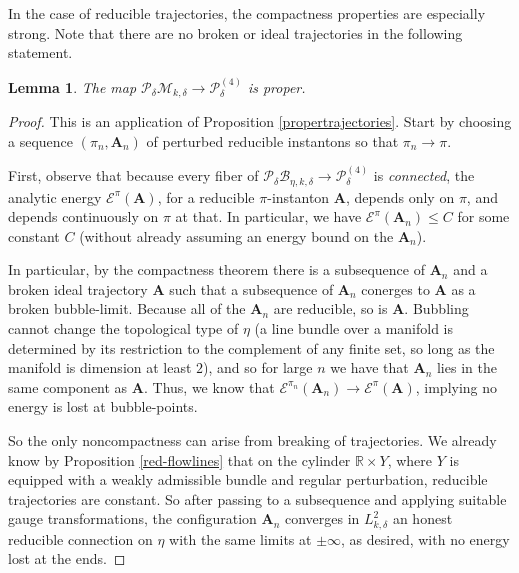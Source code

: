 \documentclass{memo-l}
\newtheorem{lemma}[theorem]{Lemma}
\theoremstyle{definition}
\theoremstyle{remark}
\numberwithin{section}{chapter}
\numberwithin{equation}{chapter}
\begin{document}
In the case of reducible trajectories, the compactness properties are especially strong. Note that there are no broken or ideal trajectories in the following statement.

\begin{lemma}\label{C-proper}The map $\mathcal P_\delta \mathcal M_{k,\delta} \to \mathcal P^{(4)}_{\delta}$ is proper.
\end{lemma}

\begin{proof}This is an application of Proposition \ref{propertrajectories}. Start by choosing a sequence $(\pi_n, \mathbf{A}_n)$ of perturbed reducible instantons so that $\pi_n \to \pi$.

First, observe that because every fiber of $\mathcal P_\delta \mathcal B_{\eta, k, \delta} \to \mathcal P^{(4)}_\delta$ is \emph{connected}, the analytic energy $\mathcal E^\pi(\mathbf{A})$, for a reducible $\pi$-instanton $\mathbf{A}$, depends only on $\pi$, and depends continuously on $\pi$ at that. In particular, we have $\mathcal E^{\pi}(\mathbf{A}_n) \leq C$ for some constant $C$ (without already assuming an energy bound on the $\mathbf{A}_n$).

In particular, by the compactness theorem there is a subsequence of $\mathbf{A}_n$ and a broken ideal trajectory $\mathbf{A}$ such that a subsequence of $\mathbf{A}_n$ conerges to $\mathbf{A}$ as a broken bubble-limit. Because all of the $\mathbf{A}_n$ are reducible, so is $\mathbf{A}$. Bubbling cannot change the topological type of $\eta$ (a line bundle over a manifold is determined by its restriction to the complement of any finite set, so long as the manifold is dimension at least $2$), and so for large $n$ we have that $\mathbf{A}_n$ lies in the same component as $\mathbf{A}$. Thus, we know that $\mathcal E^{\pi_n}(\mathbf{A}_n) \to \mathcal E^{\pi}(\mathbf{A})$, implying no energy is lost at bubble-points.

So the only noncompactness can arise from breaking of trajectories. We already know by Proposition \ref{red-flowlines} that on the cylinder $\mathbb R \times Y$, where $Y$ is equipped with a weakly admissible bundle and regular perturbation, reducible trajectories are constant. So after passing to a subsequence and applying suitable gauge transformations, the configuration $\mathbf{A}_n$ converges in $L^2_{k,\delta}$ an honest reducible connection on $\eta$ with the same limits at $\pm \infty$, as desired, with no energy lost at the ends.
\end{proof}
\end{document}
